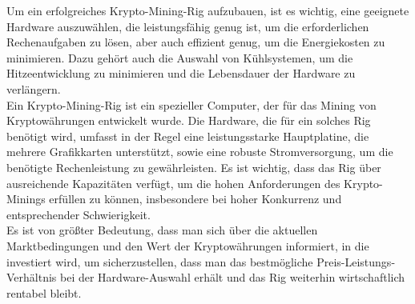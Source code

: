 \documentclass[ngerman]{scrreprt}
\begin{document}
Um ein erfolgreiches Krypto-Mining-Rig aufzubauen, ist es wichtig, eine geeignete Hardware auszuwählen, die leistungsfähig genug ist, um die erforderlichen Rechenaufgaben zu lösen, aber auch effizient genug, um die Energiekosten zu minimieren. Dazu gehört auch die Auswahl von Kühlsystemen, um die Hitzeentwicklung zu minimieren und die Lebensdauer der Hardware zu verlängern. \\
 
Ein Krypto-Mining-Rig ist ein spezieller Computer, der für das Mining von Kryptowährungen entwickelt wurde. Die Hardware, die für ein solches Rig benötigt wird, umfasst in der Regel eine leistungsstarke Hauptplatine, die mehrere Grafikkarten unterstützt, sowie eine robuste Stromversorgung, um die benötigte Rechenleistung zu gewährleisten. Es ist wichtig, dass das Rig über ausreichende Kapazitäten verfügt, um die hohen Anforderungen des Krypto-Minings erfüllen zu können, insbesondere bei hoher Konkurrenz und entsprechender Schwierigkeit. \\ 
Es ist von größter Bedeutung, dass man sich über die aktuellen Marktbedingungen und den Wert der Kryptowährungen informiert, in die investiert wird, um sicherzustellen, dass man das bestmögliche Preis-Leistungs-Verhältnis bei der Hardware-Auswahl erhält und das Rig weiterhin wirtschaftlich rentabel bleibt.
\cite{zdnet}
\newpage
\end{document}
